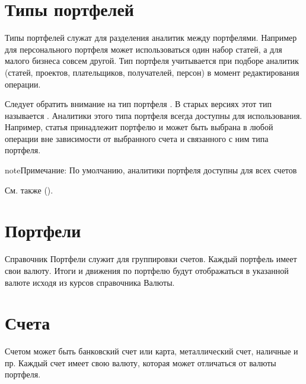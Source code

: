 \documentclass[a4paper,10pt,russian]{sphinxmanual}
\begin{document}
\noindent{}
\noindent{}


\section{Типы портфелей}
\label{\detokenize{directories:id2}}
Типы портфелей служат для разделения аналитик между портфелями. Например для персонального портфеля
может использоваться один набор статей, а для малого бизнеса совсем другой.
Тип портфеля учитывается при подборе аналитик (статей, проектов, плательщиков, получателей, персон) в
момент редактирования операции.

\noindent{}
\noindent{}
\noindent{}

Следует обратить внимание на тип портфеля . В старых версиях этот тип называется .
Аналитики этого типа портфеля всегда доступны для использования. Например, статья 
принадлежит портфелю  и может быть выбрана в любой операции вне зависимости от выбранного счета и
связанного с ним типа портфеля.

\begin{sphinxadmonition}{note}{Примечание:}
По умолчанию, аналитики портфеля  доступны для всех счетов
\end{sphinxadmonition}

См. также {\hyperref[\detokenize{shared-transactions:chapter-shared-transactions}]{}} ().


\section{Портфели}
\label{\detokenize{directories:id3}}
Справочник Портфели служит для группировки счетов. Каждый портфель имеет свои валюту. Итоги и движения по портфелю
будут отображаться в указанной валюте исходя из курсов справочника Валюты.


\section{Счета}
\label{\detokenize{directories:id4}}
Счетом может быть банковский счет или карта, металлический счет,
наличные и пр. Каждый счет имеет свою валюту, которая может отличаться от валюты портфеля.
\end{document}
